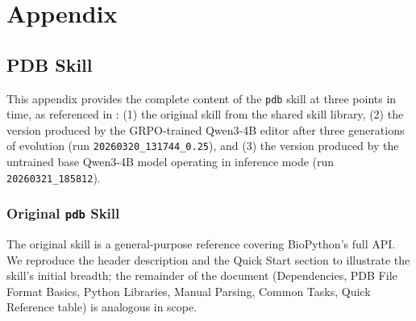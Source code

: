 
\section{Appendix}

\subsection{PDB Skill}
\label{app:pdb_skill_comparison}

This appendix provides the complete content of the \texttt{pdb} skill at three points in time, as referenced in : (1) the original skill from the shared skill library, (2) the version produced by the GRPO-trained Qwen3-4B editor after three generations of evolution (run \texttt{20260320\_131744\_0.25}), and (3) the version produced by the untrained base Qwen3-4B model operating in inference mode (run \texttt{20260321\_185812}).

\subsubsection{Original \texttt{pdb} Skill}

The original skill is a general-purpose reference covering BioPython's full API. We reproduce the header description and the Quick Start section to illustrate the skill's initial breadth; the remainder of the document (Dependencies, PDB File Format Basics, Python Libraries, Manual Parsing, Common Tasks, Quick Reference table) is analogous in scope.

